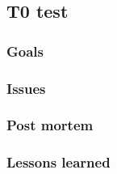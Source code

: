 


\subsection{T0 test}
\label{sec:test:t0}


\subsubsection{Goals}
\label{sec:test:t0:goals}

\subsubsection{Issues}
\label{sec:test:t0:Issues}

\subsubsection{Post mortem}
\label{sec:test:t0:postmortem}

\subsubsection{Lessons learned}
\label{sec:test:t0:lessons}
